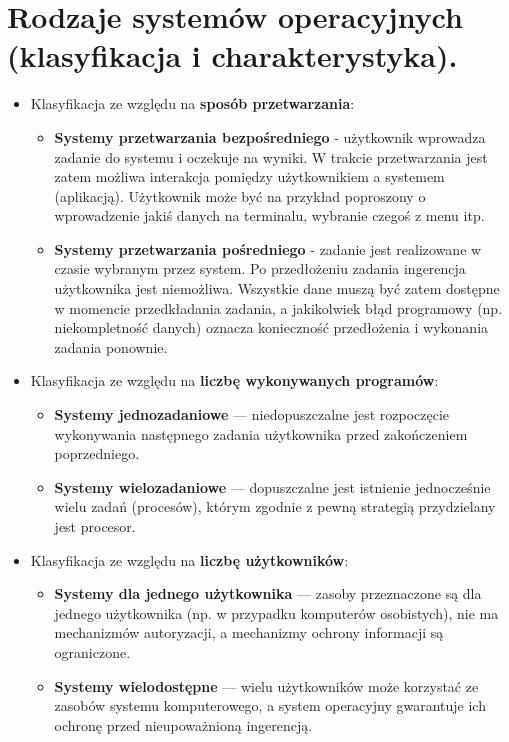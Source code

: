 \documentclass[12pt,a4paper]{article}
\begin{document}
	\section{Rodzaje systemów operacyjnych (klasyfikacja i charakterystyka).}
	\begin{itemize}
		\item Klasyfikacja ze względu na \textbf{sposób przetwarzania}:
		\begin{itemize}
			\item \textbf{Systemy przetwarzania bezpośredniego} - użytkownik wprowadza zadanie do systemu i oczekuje na wyniki. W trakcie przetwarzania jest zatem możliwa interakcja pomiędzy użytkownikiem a systemem (aplikacją). Użytkownik może być na przykład poproszony o wprowadzenie jakiś danych na terminalu, wybranie czegoś z menu itp.
			\item \textbf{Systemy przetwarzania pośredniego} -  zadanie jest realizowane w czasie wybranym przez system. Po przedłożeniu zadania ingerencja użytkownika jest niemożliwa. Wszystkie dane muszą być zatem dostępne w momencie przedkładania zadania, a jakikolwiek błąd programowy (np. niekompletność danych) oznacza konieczność przedłożenia i wykonania zadania ponownie.
		\end{itemize}
	
		\item Klasyfikacja ze względu na \textbf{liczbę wykonywanych programów}:
		\begin{itemize}
			\item  \textbf{Systemy jednozadaniowe} — niedopuszczalne jest rozpoczęcie wykonywania następnego zadania użytkownika przed zakończeniem poprzedniego.
			\item \textbf{Systemy wielozadaniowe} — dopuszczalne jest istnienie jednocześnie wielu zadań (procesów), którym zgodnie z pewną strategią przydzielany jest procesor.
		\end{itemize}
	
		\item Klasyfikacja ze względu na \textbf{liczbę użytkowników}:
		\begin{itemize}
			\item \textbf{Systemy dla jednego użytkownika} — zasoby przeznaczone są dla jednego użytkownika (np. w przypadku komputerów osobistych), nie ma mechanizmów autoryzacji, a mechanizmy ochrony informacji są ograniczone.
			\item \textbf{Systemy wielodostępne} — wielu użytkowników może korzystać ze zasobów systemu komputerowego, a system operacyjny gwarantuje ich ochronę przed nieupoważnioną ingerencją.
		\end{itemize}
	

\end{itemize}
\end{document}

